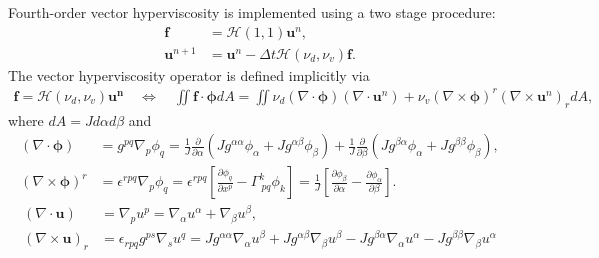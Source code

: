 \documentclass[gmdd, hvmath, online]{copernicus_discussions}
\newcommand{\vb}{\mathbf}
\newcommand{\vg}{\boldsymbol}
\newcommand{\pdiff}[2]{\frac{\partial #1}{\partial #2}}
\begin{document}
Fourth-order vector hyperviscosity is implemented using a two stage procedure:
\begin{align}
\vb{f} &= \mathcal{H}(1,1) \vb{u}^n, \\
\vb{u}^{n+1} &= \vb{u}^n - \Delta t \mathcal{H}(\nu_d, \nu_v) \vb{f}.
\end{align}  The vector hyperviscosity operator is defined implicitly via
\begin{align}
\vb{f} = \mathcal{H}(\nu_d, \nu_v) \vb{u^n} \quad \Longleftrightarrow \quad \iint \vb{f} \cdot \vg{\phi} dA = \iint \nu_d (\nabla \cdot \vg{\phi}) (\nabla \cdot \vb{u}^n) + \nu_v (\nabla \times \vg{\phi})^r (\nabla \times \vb{u}^n)_r dA,
\end{align} where $dA = J d\alpha d\beta$ and
\begin{align}
(\nabla \cdot \vg{\phi}) &= g^{p q} \nabla_p \phi_q = \frac{1}{J} \pdiff{}{\alpha} \left( J g^{\alpha \alpha} \phi_\alpha + J g^{\alpha \beta} \phi_\beta \right) + \frac{1}{J} \pdiff{}{\beta} \left( J g^{\beta \alpha} \phi_\alpha + J g^{\beta \beta} \phi_\beta \right), \\
(\nabla \times \vg{\phi})^r &= \epsilon^{r p q} \nabla_p \phi_q = \epsilon^{r p q} \left[ \pdiff{\phi_q}{x^p} - \Gamma^{k}_{\ p q} \phi_k \right] = \frac{1}{J} \left[ \pdiff{\phi_\beta}{\alpha} - \pdiff{\phi_\alpha}{\beta} \right].
\end{align}
\begin{align}
(\nabla \cdot \vb{u}) &= \nabla_p u^p = \nabla_\alpha u^\alpha + \nabla_\beta u^\beta, \\
(\nabla \times \vb{u})_r &= \epsilon_{rpq} g^{ps} \nabla_s u^q = J g^{\alpha \alpha} \nabla_\alpha u^\beta + J g^{\alpha \beta} \nabla_\beta u^\beta - J g^{\beta \alpha} \nabla_\alpha u^\alpha - J g^{\beta \beta} \nabla_\beta u^\alpha
\end{align}
\end{document}
